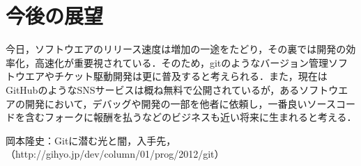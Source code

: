 \documentclass[a4j,9pt,twocolumn]{jsarticle}
\begin{document}
\section{今後の展望}
今日，ソフトウエアのリリース速度は増加の一途をたどり，その裏では開発の効率化，高速化が重要視されている．そのため，gitのようなバージョン管理ソフトウエアやチケット駆動開発は更に普及すると考えられる．また，現在はGitHubのようなSNSサービスは概ね無料で公開されているが，あるソフトウエアの開発において，デバッグや開発の一部を他者に依頼し，一番良いソースコードを含むフォークに報酬を払うなどのビジネスも近い将来に生まれると考える．

\small
\begin{thebibliography}{99}
岡本隆史：Gitに潜む光と闇，入手先，（http://gihyo.jp/dev/column/01/prog/2012/git）

\end{thebibliography}
\end{document}
